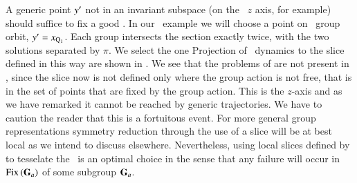 A generic point ${y'} $ not in an invariant subspace (on
the \CLe\ $z$ axis, for example) should suffice to fix a good
\slice. In our \cLe\ example we will choose a point on \reqv\ group orbit,
 ${y'}  = x_{\mathrm{Q}_{1}}$. 
Each group intersects the section exactly twice,  with the
two solutions separated by $\pi$. We select the one  
 
Projection of \cLe\ dynamics to the slice defined in this way are
shown in . We see that the problems of 
 are not present in , since
the slice now is not defined only where the group action is not free,
that is in the set of points that are fixed by the group action. This
is the $z$-axis and as we have remarked it cannot be reached by generic
trajectories. We have to caution the reader that this is a fortuitous
event. For more general group representations symmetry reduction through
the use of a slice will be at best local as we intend to discuss 
elsewhere. Nevertheless, using local slices defined by 
to tesselate the \reducedsp\ is an optimal choice in the sense that any
failure will occur in \fixedsp\ $\mathrm{Fix}\left(\mathbf{G}_a\right)$ of some subgroup
$\mathbf{G}_a$.


